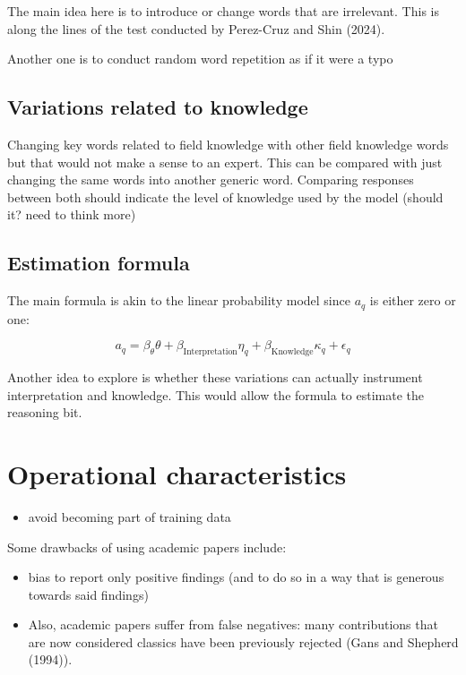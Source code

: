 \documentclass[
]{article}
\providecommand{\tightlist}{%
  \setlength{\itemsep}{0pt}\setlength{\parskip}{0pt}}\usepackage{longtable,booktabs,array}
\begin{document}
The main idea here is to introduce or change words that are irrelevant.
This is along the lines of the test conducted by Perez-Cruz and Shin
(2024).

Another one is to conduct random word repetition as if it were a typo

\subsection{Variations related to
knowledge}\label{variations-related-to-knowledge}

Changing key words related to field knowledge with other field knowledge
words but that would not make a sense to an expert. This can be compared
with just changing the same words into another generic word. Comparing
responses between both should indicate the level of knowledge used by
the model (should it? need to think more)

\subsection{Estimation formula}\label{estimation-formula}

The main formula is akin to the linear probability model since \(a_{q}\)
is either zero or one:

\[
a_{q} = \beta_{\theta} \theta + \beta_{\text{Interpretation}} \eta_q + \beta_{\text{Knowledge}} \kappa_q + \epsilon_q
\]

Another idea to explore is whether these variations can actually
instrument interpretation and knowledge. This would allow the formula to
estimate the reasoning bit.

\section{Operational characteristics}\label{operational-characteristics}

\begin{itemize}
\tightlist
\item
  avoid becoming part of training data
\end{itemize}

Some drawbacks of using academic papers include:

\begin{itemize}
\tightlist
\item
  bias to report only positive findings (and to do so in a way that is
  generous towards said findings)
\item
  Also, academic papers suffer from false negatives: many contributions
  that are now considered classics have been previously rejected (Gans
  and Shepherd (1994)).
\end{itemize}
\end{document}
